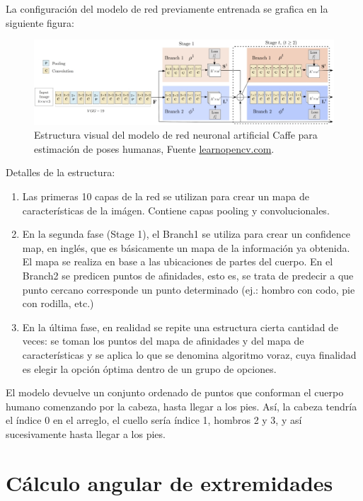\documentclass[a4paper,12pt,oneside,spanish]{book}
\begin{document}
La configuración del modelo de red previamente entrenada se grafica en la siguiente figura:
\begin{figure}[h!]
	\includegraphics[width=450pt]{Imagenes/network_pose1.jpg}
	\centering	
	\caption{Estructura visual del modelo de red neuronal artificial Caffe para estimación de poses humanas, Fuente \url{learnopencv.com}.}
	\label{fig:network_pose1}
\end{figure}	

Detalles de la estructura:
\begin{enumerate}\baselineskip 16pt	
	\item Las primeras 10 capas de la red se utilizan para crear un mapa de características de la imágen. Contiene capas pooling y convolucionales.
	\item En la segunda fase (Stage 1), el Branch1 se utiliza para crear un confidence map, en inglés, que es básicamente un mapa de la información ya obtenida. El mapa se realiza en base a las ubicaciones de partes del cuerpo. En el Branch2 se predicen puntos de afinidades, esto es, se trata de predecir a que punto cercano corresponde un punto determinado (ej.: hombro con codo, pie con rodilla, etc.)
	\item En la última fase, en realidad se repite una estructura cierta cantidad de veces: se toman los puntos del mapa de afinidades y del mapa de características y se aplica lo que se denomina algoritmo voraz, cuya finalidad es elegir la opción óptima dentro de un grupo de opciones.
\end{enumerate}	\baselineskip 16pt

El modelo devuelve un conjunto ordenado de puntos que conforman el cuerpo humano comenzando por la cabeza, hasta llegar a los pies. Así, la cabeza tendría el índice 0 en el arreglo, el cuello sería índice 1, hombros 2 y 3, y así sucesivamente hasta llegar a los pies.\par

\section{Cálculo angular de extremidades}
\end{document}
